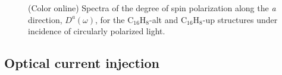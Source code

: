\documentclass[pss]{wiley2sp} %
\begin{document}
\begin{figure}[t]
\hfill
{}
\caption{(Color online) Spectra of the degree of spin polarization along the
\emph{a} direction, {$D^{a}(\omega)$}, for the C$_{16}$H$_{8}$-alt and
C$_{16}$H$_{8}$-up structures under incidence of circularly polarized light.\label{fig:Da}}
\end{figure}


\subsection{Optical current injection}\label{subsec:results-eta}
\end{document}
